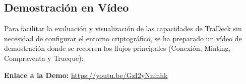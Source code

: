 \subsection{Demostración en Vídeo}
Para facilitar la evaluación y visualización de las capacidades de TraDeck sin necesidad de configurar el entorno criptográfico, se ha preparado un vídeo de demostración donde se recorren los flujos principales (Conexión, Minting, Compraventa y Trueque):

\begin{center}
	\textbf{Enlace a la Demo:} \url{https://youtu.be/GzI2yNninhk}
\end{center}